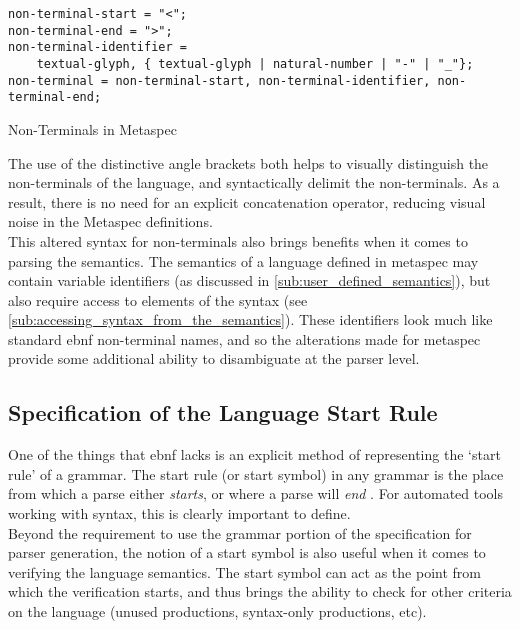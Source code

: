 \begin{listing}[!htb]
\begin{verbatim}
non-terminal-start = "<";
non-terminal-end = ">";
non-terminal-identifier = 
    textual-glyph, { textual-glyph | natural-number | "-" | "_"};
non-terminal = non-terminal-start, non-terminal-identifier, non-terminal-end;
\end{verbatim}
\caption{Non-Terminals in Metaspec}
\label{lst:non_terminals_in_metaspec}
\end{listing}

The use of the distinctive angle brackets both helps to visually distinguish the non-terminals of the language, and syntactically delimit the non-terminals.
As a result, there is no need for an explicit concatenation operator, reducing visual noise in the Metaspec definitions.\\

This altered syntax for non-terminals also brings benefits when it comes to parsing the semantics. 
The semantics of a language defined in metaspec may contain variable identifiers (as discussed in \autoref{sub:user_defined_semantics}), but also require access to elements of the syntax (see \autoref{sub:accessing_syntax_from_the_semantics}).
These identifiers look much like standard \gls{ebnf} non-terminal names, and so the alterations made for \gls{metaspec} provide some additional ability to disambiguate at the parser level. 


\subsection{Specification of the Language Start Rule} %
\label{sub:specification_of_the_language_start_rule}
One of the things that \gls{ebnf} lacks is an explicit method of representing the `start rule' of a grammar. 
The start rule (or start symbol) in any grammar is the place from which a parse either \textit{starts}, or where a parse will \textit{end} \citep{slonneger1995formal}.
For automated tools working with syntax, this is clearly important to define. \\

Beyond the requirement to use the grammar portion of the specification for parser generation, the notion of a start symbol is also useful when it comes to verifying the language semantics.
The start symbol can act as the point from which the verification starts, and thus brings the ability to check for other criteria on the language (unused productions, syntax-only productions, etc). \\

